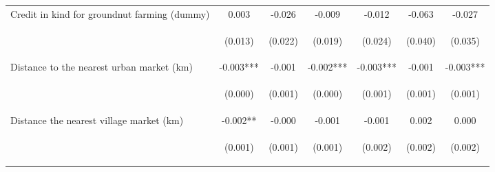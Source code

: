 \begin{center}
\begin{tabular}{lcccccc}
Credit in kind for groundnut farming (dummy) & 0.003 & -0.026 & -0.009 & -0.012 & -0.063 & -0.027 \\
\vspace{4pt} & \begin{footnotesize}(0.013)\end{footnotesize} & \begin{footnotesize}(0.022)\end{footnotesize} & \begin{footnotesize}(0.019)\end{footnotesize} & \begin{footnotesize}(0.024)\end{footnotesize} & \begin{footnotesize}(0.040)\end{footnotesize} & \begin{footnotesize}(0.035)\end{footnotesize} \\
Distance to the nearest urban market (km) & -0.003*** & -0.001 & -0.002*** & -0.003*** & -0.001 & -0.003*** \\
\vspace{4pt} & \begin{footnotesize}(0.000)\end{footnotesize} & \begin{footnotesize}(0.001)\end{footnotesize} & \begin{footnotesize}(0.000)\end{footnotesize} & \begin{footnotesize}(0.001)\end{footnotesize} & \begin{footnotesize}(0.001)\end{footnotesize} & \begin{footnotesize}(0.001)\end{footnotesize} \\
Distance the nearest village market (km) & -0.002** & -0.000 & -0.001 & -0.001 & 0.002 & 0.000 \\
\vspace{4pt} & \begin{footnotesize}(0.001)\end{footnotesize} & \begin{footnotesize}(0.001)\end{footnotesize} & \begin{footnotesize}(0.001)\end{footnotesize} & \begin{footnotesize}(0.002)\end{footnotesize} & \begin{footnotesize}(0.002)\end{footnotesize} & \begin{footnotesize}(0.002)\end{footnotesize} \\

\end{tabular}
\end{center}
